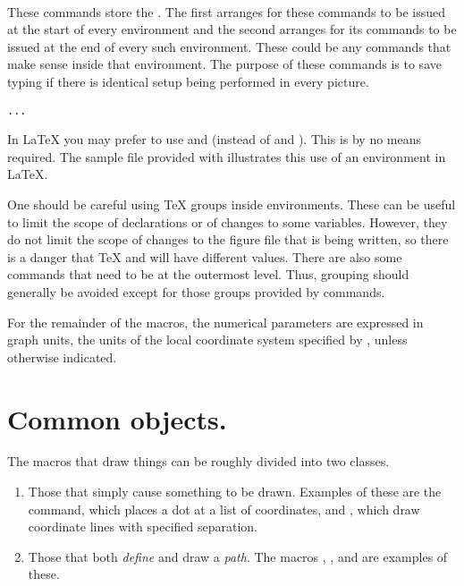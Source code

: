 \documentclass[letterpaper]{article}
\begin{document}
\begin{cd}
\\
%
%
%
\end{cd}

These commands store the . The first arranges for these
commands to be issued at the start of every  environment and
the second arranges for its commands to be issued at the end of every
such environment. These could be any commands that make sense inside
that environment. The purpose of these commands is to save typing if
there is identical setup being performed in every picture.

\begin{cd}
\texttt{...}%
\end{cd}

In \LaTeX{} you may prefer to use  and
 (instead of  and ). This is
by no means required. The sample file  provided
with \mfp{} illustrates this use of an  environment in
\LaTeX{}.

\medskip
One should be careful using \TeX{} groups inside 
environments. These can be useful to limit the scope of declarations or
of changes to some variables. However, they do not limit the scope of
changes to the figure file that is being written, so there is a danger
that \TeX{} and \MF{} will have different values. There are also some
\mfp{} commands that need to be at the outermost level. Thus, grouping
should generally be avoided except for those groups provided by \mfp{}
commands.

\medskip
For the remainder of the macros, the numerical parameters are expressed
in graph units, the units of the local coordinate system specified by
, unless otherwise indicated.


\section{Common objects.}\label{figures}

The \mfp{} macros that draw things can be roughly divided into two
classes.
\begin{enumerate}
  \item Those that simply cause something to be drawn. Examples of these
    are the  command, which places a dot at a list of
    coordinates, and , which draw coordinate lines with
    specified separation.
  \item Those that both \emph{define} and draw a \emph{path}. The macros
     , , and  are examples of these.
\end{enumerate}
\end{document}
